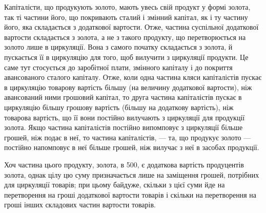 Капіталісти, що продукують золото, мають увесь свій продукт у
формі золота, так ті частини його, що покривають сталий і змінний
капітал, як і ту частину його, яка складається з додаткової вартости.
Отже, частина суспільної додаткової вартости складається з золота, а
не з такого продукту, що перетворюється на золото лише в циркуляції.
Вона з самого початку складається з золота, й пускається її в циркуляцію
для того, щоб вилучити з циркуляції продукти. Це саме тут стосується
до заробітної плати, змінного капіталу і до покриття авансованого
сталого капіталу. Отже, коли одна частина кляси капіталістів пускає в
циркуляцію товарову вартість більшу (на величину додаткової вартости),
ніж авансований ними грошовий капітал, то друга частина капіталістів
пускає в циркуляцію більшу грошову вартість (більшу на додаткову
вартість), ніж товарова вартість, що її вони постійно вилучають з циркуляції
для продукції золота. Якщо частина капіталістів постійно випомповує
з циркуляції більше грошей, ніж подає в неї, то частина капіталістів,
— та, що продукує золото — постійно напомповує в неї більше
грошей, ніж вилучає з неї в засобах продукції.

Хоч частина цього продукту, золота, в 500, є додаткова
вартість продуцентів золота, однак цілу цю суму призначається лише на
заміщення грошей, потрібних для циркуляції товарів; при цьому байдуже,
скільки з цієї суми йде на перетворення на гроші додаткової вартости
товарів і скільки на перетворення на гроші інших складових частин
вартости товарів.

